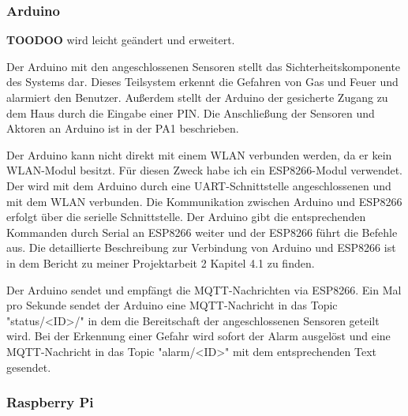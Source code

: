 \documentclass[12pt, letterpaper]{article}
\begin{document}
  \subsubsection{Arduino}
  \par \textbf{TOODOO} wird leicht geändert und erweitert.
  \par Der Arduino mit den angeschlossenen Sensoren stellt das Sichterheitskomponente des Systems dar. Dieses Teilsystem erkennt die Gefahren von Gas und Feuer und alarmiert den Benutzer. Außerdem stellt der Arduino der gesicherte Zugang zu dem Haus durch die Eingabe einer PIN. Die Anschließung der Sensoren und Aktoren an Arduino ist in der PA1 \cite{pa1} beschrieben. 
  \par Der Arduino kann nicht direkt mit einem WLAN verbunden werden, da er kein WLAN-Modul besitzt. Für diesen Zweck habe ich ein ESP8266-Modul verwendet. Der wird mit dem Arduino durch eine UART-Schnittstelle angeschlossenen und mit dem WLAN verbunden. Die Kommunikation zwischen Arduino und ESP8266 erfolgt über die serielle Schnittstelle. Der Arduino gibt die entsprechenden Kommanden durch Serial an ESP8266 weiter und der ESP8266 führt die Befehle aus. Die detaillierte Beschreibung zur Verbindung von Arduino und ESP8266 ist in dem Bericht zu meiner Projektarbeit 2 \cite{pa2} Kapitel 4.1 zu finden.
  \par Der Arduino sendet und empfängt die MQTT-Nachrichten via ESP8266. Ein Mal pro Sekunde sendet der Arduino eine MQTT-Nachricht in das Topic "status/<ID>/" in dem die Bereitschaft der angeschlossenen Sensoren geteilt wird. Bei der Erkennung einer Gefahr wird sofort der Alarm ausgelöst und eine MQTT-Nachricht in das Topic "alarm/<ID>" mit dem entsprechenden Text gesendet.
  \subsubsection{Raspberry Pi}
\end{document}
